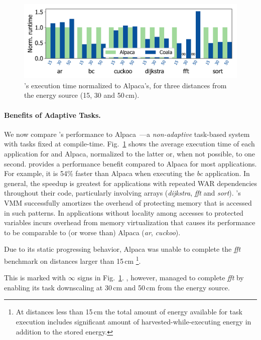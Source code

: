 \begin{figure}
    \includegraphics[width=.8\columnwidth]{figures/coala_alpaca_gcc}
    \caption{\sys's execution time normalized to Alpaca's,
    for three distances from the energy source (15, 30 and 50\,cm). }
    \label{fig:runtime}
\end{figure}

\paragraph{Benefits of Adaptive Tasks.}
%
We now compare \sys's performance to Alpaca~\cite{alpaca}---a
\emph{non-adaptive} task-based system with tasks fixed at compile-time.
Fig.~\ref{fig:runtime} shows the average execution time of each
application for \sys and Alpaca, normalized to the latter or, when not possible, to one second.
\sys provides a performance benefit compared to Alpaca for most
applications. For example, it is 54\% faster than Alpaca when executing the \textit{bc} application. In general, the speedup is greatest for applications with repeated WAR
dependencies throughout their code, particularly involving arrays
(\textit{dijkstra}, \textit{fft} and \textit{sort}). \sys's VMM
successfully amortizes the overhead of protecting memory that is accessed in
such patterns.  In applications without locality among accesses to protected
variables \sys incurs overhead from memory
virtualization that causes its performance to be comparable to (or worse than)
Alpaca (\textit{ar}, \textit{cuckoo}).

Due to its static progressing behavior, Alpaca was unable to complete the \textit{fft} benchmark on distances larger than 15\,cm
\footnote{At distances less than 15\,cm the total amount of energy available for task execution includes significant amount of harvested-while-executing energy in addition to the stored energy.}.

This is marked with $\infty$ signs in Fig.~\ref{fig:runtime}. \sys, however, managed to complete \textit{fft} by enabling its task downscaling at 30\,cm and 50\,cm from the energy source.

